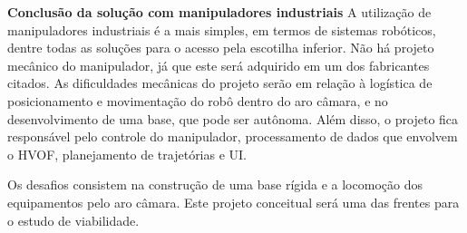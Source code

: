 \textbf{Conclusão da solução com manipuladores industriais}
A utilização de manipuladores industriais é a mais simples, em termos de
sistemas robóticos, dentre todas as soluções para o acesso pela escotilha
inferior.
Não há projeto mecânico do manipulador, já que este será adquirido em um dos fabricantes citados. As dificuldades mecânicas do projeto serão em relação à logística de posicionamento
e movimentação do robô dentro do aro câmara, e no desenvolvimento de uma base,
que pode ser autônoma. Além disso, o projeto fica responsável pelo controle do
manipulador, processamento de dados que envolvem o HVOF, planejamento de
trajetórias e UI.

Os desafios consistem na construção de uma base rígida e a locomoção dos
equipamentos pelo aro câmara. Este projeto conceitual será uma das frentes para
o estudo de viabilidade.
